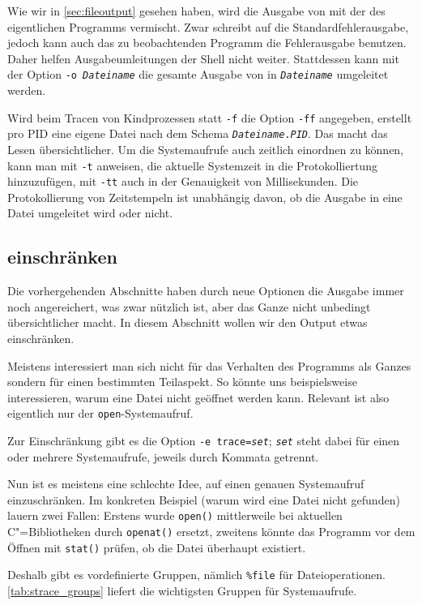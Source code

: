 Wie wir in \autoref{sec:fileoutput} gesehen haben, wird die Ausgabe von \strace{} mit der des
eigentlichen Programms vermischt. Zwar schreibt \strace{} auf die Standardfehlerausgabe, jedoch
kann auch das zu beobachtenden Programm die Fehlerausgabe benutzen. Daher helfen Ausgabeumleitungen
der Shell nicht weiter. Stattdessen kann mit der Option \texttt{-o \emph{Dateiname}} die gesamte
Ausgabe von \strace{} in \texttt{\emph{Dateiname}} umgeleitet werden.

Wird beim Tracen von Kindprozessen statt \texttt{-f} die Option \texttt{-ff} angegeben, erstellt
\strace{} pro PID eine eigene Datei nach dem Schema \texttt{\emph{Dateiname}.\emph{PID}}. Das macht
das Lesen übersichtlicher. Um die Systemaufrufe auch zeitlich einordnen zu können, kann man
\strace{} mit \texttt{-t} anweisen, die aktuelle Systemzeit in die Protokolliertung hinzuzufügen,
mit \texttt{-tt} auch in der Genauigkeit von Millisekunden. Die Protokollierung von Zeitstempeln
ist unabhängig davon, ob die Ausgabe in eine Datei umgeleitet wird oder nicht.

\subsection{\strace{} einschränken}

Die vorhergehenden Abschnitte haben durch neue Optionen die Ausgabe immer noch angereichert, was
zwar nützlich ist, aber das Ganze nicht unbedingt übersichtlicher macht. In diesem Abschnitt wollen
wir den Output etwas einschränken.

Meistens interessiert man sich nicht für das Verhalten des Programms als Ganzes sondern für einen
bestimmten Teilaspekt. So könnte uns beispielsweise interessieren, warum eine Datei nicht geöffnet
werden kann. Relevant ist also eigentlich nur der \texttt{open}-Systemaufruf.

Zur Einschränkung gibt es die Option \texttt{-e trace=\emph{set}}; \texttt{\emph{set}}
steht dabei für einen oder mehrere Systemaufrufe, jeweils durch Kommata getrennt.

Nun ist es meistens eine schlechte Idee, \strace{} auf einen genauen Systemaufruf einzuschränken.
Im konkreten Beispiel (warum wird eine Datei nicht gefunden) lauern zwei Fallen: Erstens wurde
\texttt{open()} mittlerweile bei aktuellen C"=Bibliotheken durch \texttt{openat()} ersetzt, zweitens
könnte das Programm vor dem Öffnen mit \texttt{stat()} prüfen, ob die Datei überhaupt existiert.

Deshalb gibt es vordefinierte Gruppen, nämlich \texttt{\%file} für Dateioperationen.
\autoref{tab:strace_groups} liefert die wichtigsten Gruppen für Systemaufrufe.


